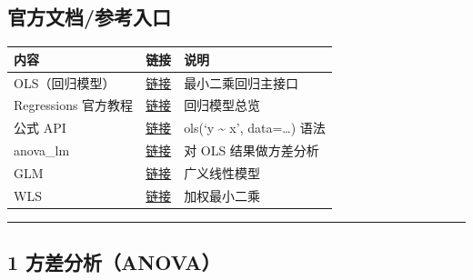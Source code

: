 \subsection{官方文档/参考入口}\label{ux5b98ux65b9ux6587ux6863ux53c2ux8003ux5165ux53e3-5}

{\def\LTcaptype{none} %
\begin{longtable}[]{@{}
  >{\raggedright\arraybackslash}p{}
  >{\raggedright\arraybackslash}p{}
  >{\raggedright\arraybackslash}p{}@{}}
\toprule\noalign{}
\begin{minipage}[b]{\linewidth}\raggedright
内容
\end{minipage} & \begin{minipage}[b]{\linewidth}\raggedright
链接
\end{minipage} & \begin{minipage}[b]{\linewidth}\raggedright
说明
\end{minipage} \\
\midrule\noalign{}
\endhead
\bottomrule\noalign{}
\endlastfoot
OLS（回归模型） &
\href{https://www.statsmodels.org/stable/generated/statsmodels.regression.linear_model.OLS.html}{链接}
& 最小二乘回归主接口 \\
Regressions 官方教程 &
\href{https://www.statsmodels.org/stable/regression.html}{链接} &
回归模型总览 \\
公式 API & \href{https://www.statsmodels.org/stable/formula.html}{链接}
& ols(`y \textasciitilde{} x', data=\ldots) 语法 \\
anova\_lm &
\href{https://www.statsmodels.org/stable/generated/statsmodels.stats.anova.anova_lm.html}{链接}
& 对 OLS 结果做方差分析 \\
GLM &
\href{https://www.statsmodels.org/stable/generated/statsmodels.genmod.generalized_linear_model.GLM.html}{链接}
& 广义线性模型 \\
WLS &
\href{https://www.statsmodels.org/stable/generated/statsmodels.regression.linear_model.WLS.html}{链接}
& 加权最小二乘 \\
\end{longtable}
}

\begin{center}\rule{0.5\linewidth}{0.5pt}\end{center}

\subsection{1 方差分析（ANOVA）}\label{ux65b9ux5deeux5206ux6790anova}

